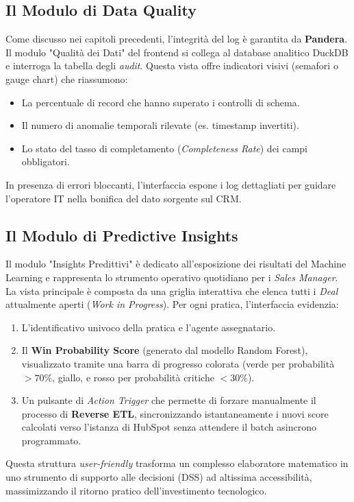 \documentclass[12pt, a4paper]{report}
\begin{document}
\subsection*{Il Modulo di Data Quality}
Come discusso nei capitoli precedenti, l'integrità del log è garantita da \textbf{Pandera}. Il modulo "Qualità dei Dati" del frontend si collega al database analitico DuckDB e interroga la tabella degli \textit{audit}. Questa vista offre indicatori visivi (semafori o gauge chart) che riassumono:
\begin{itemize}
    \item La percentuale di record che hanno superato i controlli di schema.
    \item Il numero di anomalie temporali rilevate (es. timestamp invertiti).
    \item Lo stato del tasso di completamento (\textit{Completeness Rate}) dei campi obbligatori.
\end{itemize}
In presenza di errori bloccanti, l'interfaccia espone i log dettagliati per guidare l'operatore IT nella bonifica del dato sorgente sul CRM.

\subsection*{Il Modulo di Predictive Insights}
Il modulo "Insights Predittivi" è dedicato all'esposizione dei risultati del Machine Learning e rappresenta lo strumento operativo quotidiano per i \textit{Sales Manager}. 
La vista principale è composta da una griglia interattiva che elenca tutti i \textit{Deal} attualmente aperti (\textit{Work in Progress}). Per ogni pratica, l'interfaccia evidenzia:
\begin{enumerate}
    \item L'identificativo univoco della pratica e l'agente assegnatario.
    \item Il \textbf{Win Probability Score} (generato dal modello Random Forest), visualizzato tramite una barra di progresso colorata (verde per probabilità $> 70\%$, giallo, e rosso per probabilità critiche $< 30\%$).
    \item Un pulsante di \textit{Action Trigger} che permette di forzare manualmente il processo di \textbf{Reverse ETL}, sincronizzando istantaneamente i nuovi score calcolati verso l'istanza di HubSpot senza attendere il batch asincrono programmato.
\end{enumerate}

Questa struttura \textit{user-friendly} trasforma un complesso elaboratore matematico in uno strumento di supporto alle decisioni (DSS) ad altissima accessibilità, massimizzando il ritorno pratico dell'investimento tecnologico.
\end{document}
